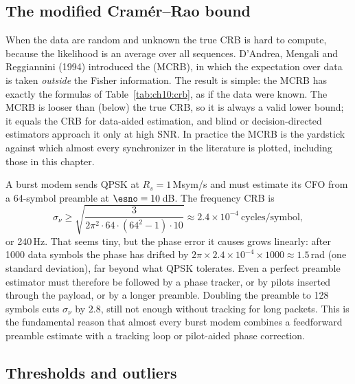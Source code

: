 
\subsection{The modified Cram\'er--Rao bound}

When the data are random and unknown the true CRB is hard to compute, because the likelihood is
an average over all sequences. D'Andrea, Mengali and Reggiannini (1994) introduced the
 (MCRB), in which the expectation over data is taken
\emph{outside} the Fisher information. The result is simple: the MCRB has exactly the formulas of
Table~\ref{tab:ch10:crb}, as if the data were known. The MCRB is looser than (below) the true CRB,
so it is always a valid lower bound; it equals the CRB for data-aided estimation, and blind or
decision-directed estimators approach it only at high SNR. In practice the MCRB is the yardstick
against which almost every synchronizer in the literature is plotted, including those in this
chapter.

\begin{worked}
A burst modem sends QPSK at $R_s=1$\,Msym/s and must estimate its CFO from a 64-symbol preamble at
$\esno=10$\,dB. The frequency CRB is
\[
\sigma_\nu\ge\sqrt{\frac{3}{2\pi^2\cdot64\cdot(64^2-1)\cdot10}}\approx2.4\times10^{-4}\ \text{cycles/symbol},
\]
or 240\,Hz. That seems tiny, but the phase error it causes grows linearly: after 1000 data symbols
the phase has drifted by $2\pi\times2.4\times10^{-4}\times1000\approx1.5$\,rad (one standard
deviation), far beyond what QPSK tolerates. Even a perfect preamble estimator must therefore be
followed by a phase tracker, or by pilots inserted through the payload, or by a longer preamble.
Doubling the preamble to 128 symbols cuts $\sigma_\nu$ by $2.8$, still not enough without tracking
for long packets. This is the fundamental reason that almost every burst modem combines a
feedforward preamble estimate with a tracking loop or pilot-aided phase correction.
\end{worked}

\subsection{Thresholds and outliers}

